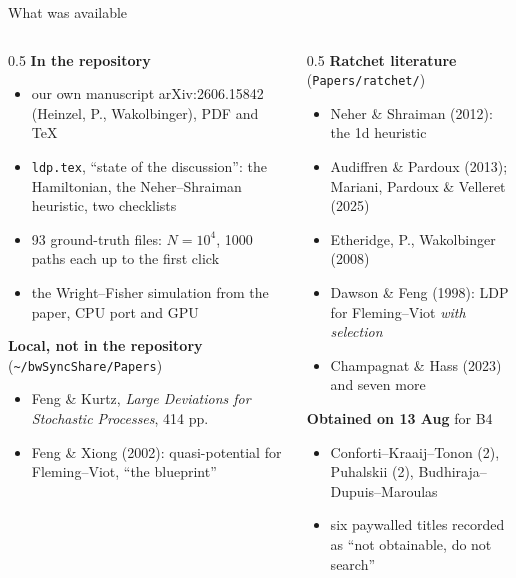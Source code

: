 \documentclass[11pt,aspectratio=169]{beamer}
\newcommand{\datei}[1]{\texttt{#1}}
\begin{document}
\begin{frame}{What was available}
  \footnotesize
  \begin{columns}[T]
    \begin{column}{0.5\textwidth}
      \textbf{In the repository}
      \begin{itemize}
      \item our own manuscript arXiv:2606.15842 (Heinzel, P., Wakolbinger),
        PDF and \TeX
      \item \datei{ldp.tex}, \enquote{state of the discussion}: the Hamiltonian, the
        Neher--Shraiman heuristic, two checklists
      \item 93 ground-truth files: $N=10^4$, 1000 paths each up to the first click
      \item the Wright--Fisher simulation from the paper, CPU port and GPU
      \end{itemize}
      \textbf{Local, not in the repository} (\datei{\textasciitilde/bwSyncShare/Papers})
      \begin{itemize}
      \item Feng \& Kurtz, \emph{Large Deviations for Stochastic Processes}, 414 pp.
      \item Feng \& Xiong (2002): quasi-potential for Fleming--Viot, \enquote{the blueprint}
      \end{itemize}
    \end{column}
    \begin{column}{0.5\textwidth}
      \textbf{Ratchet literature} (\datei{Papers/ratchet/})
      \begin{itemize}
      \item Neher \& Shraiman (2012): the 1d heuristic
      \item Audiffren \& Pardoux (2013); Mariani, Pardoux \& Velleret (2025)
      \item Etheridge, P., Wakolbinger (2008)
      \item Dawson \& Feng (1998): LDP for Fleming--Viot \emph{with selection}
      \item Champagnat \& Hass (2023) and seven more
      \end{itemize}
      \textbf{Obtained on 13 Aug} for B4
      \begin{itemize}
      \item Conforti--Kraaij--Tonon (2), Puhalskii (2),
        Budhiraja--Dupuis--Maroulas
      \item six paywalled titles recorded as \enquote{not obtainable, do not search}
      \end{itemize}
    \end{column}
  \end{columns}
\end{frame}
\end{document}

